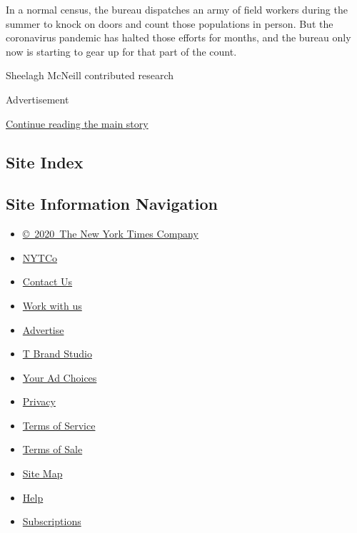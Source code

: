 In a normal census, the bureau dispatches an army of field workers
during the summer to knock on doors and count those populations in
person. But the coronavirus pandemic has halted those efforts for
months, and the bureau only now is starting to gear up for that part of
the count.

Sheelagh McNeill contributed research

Advertisement

\protect\hyperlink{after-bottom}{Continue reading the main story}

\hypertarget{site-index}{%
\subsection{Site Index}\label{site-index}}

\hypertarget{site-information-navigation}{%
\subsection{Site Information
Navigation}\label{site-information-navigation}}

\begin{itemize}
\tightlist
\item
  \href{https://help.nytimes3xbfgragh.onion/hc/en-us/articles/115014792127-Copyright-notice}{©~2020~The
  New York Times Company}
\end{itemize}

\begin{itemize}
\tightlist
\item
  \href{https://www.nytco.com/}{NYTCo}
\item
  \href{https://help.nytimes3xbfgragh.onion/hc/en-us/articles/115015385887-Contact-Us}{Contact
  Us}
\item
  \href{https://www.nytco.com/careers/}{Work with us}
\item
  \href{https://nytmediakit.com/}{Advertise}
\item
  \href{http://www.tbrandstudio.com/}{T Brand Studio}
\item
  \href{https://www.nytimes3xbfgragh.onion/privacy/cookie-policy\#how-do-i-manage-trackers}{Your
  Ad Choices}
\item
  \href{https://www.nytimes3xbfgragh.onion/privacy}{Privacy}
\item
  \href{https://help.nytimes3xbfgragh.onion/hc/en-us/articles/115014893428-Terms-of-service}{Terms
  of Service}
\item
  \href{https://help.nytimes3xbfgragh.onion/hc/en-us/articles/115014893968-Terms-of-sale}{Terms
  of Sale}
\item
  \href{https://spiderbites.nytimes3xbfgragh.onion}{Site Map}
\item
  \href{https://help.nytimes3xbfgragh.onion/hc/en-us}{Help}
\item
  \href{https://www.nytimes3xbfgragh.onion/subscription?campaignId=37WXW}{Subscriptions}
\end{itemize}
